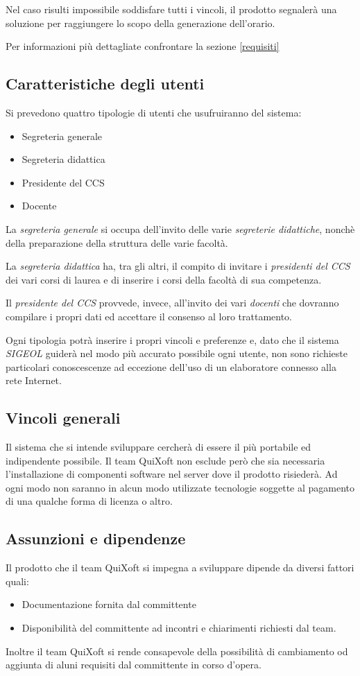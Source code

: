 \documentclass[11pt,a4paper]{article}
\begin{document}
Nel caso risulti impossibile soddisfare tutti i vincoli, il prodotto segnalerà una soluzione per raggiungere lo scopo della generazione dell'orario.

Per informazioni più dettagliate confrontare la sezione \ref{requisiti}
\subsection{Caratteristiche degli utenti} \label{utenti}
Si prevedono quattro tipologie di utenti che usufruiranno del sistema:
\begin{itemize}
 \item Segreteria generale
 \item Segreteria didattica
 \item Presidente del CCS
 \item Docente
\end{itemize}

La \textit{segreteria generale} si occupa dell'invito delle varie \textit{segreterie didattiche}, nonchè della preparazione della struttura delle varie facoltà.

La \textit{segreteria didattica} ha, tra gli altri, il compito di invitare i \textit{presidenti del CCS} dei vari corsi di laurea e di inserire i corsi della facoltà di sua competenza.

Il \textit{presidente del CCS} provvede, invece, all'invito dei vari \textit{docenti} che dovranno compilare i propri dati ed accettare il consenso al loro trattamento.

Ogni tipologia potrà inserire i propri vincoli e preferenze e, dato che il sistema \textit{SIGEOL} guiderà nel modo più accurato possibile ogni utente, non sono richieste particolari conoscescenze ad eccezione dell'uso di un elaboratore connesso alla rete Internet.
\subsection{Vincoli generali}
Il sistema che si intende sviluppare cercherà di essere il più portabile ed indipendente possibile. Il team QuiXoft non esclude però che sia necessaria l'installazione di componenti software nel server dove il prodotto risiederà. Ad ogni modo non saranno in alcun modo utilizzate tecnologie soggette al pagamento di una qualche forma di licenza o altro.
\subsection{Assunzioni e dipendenze}
Il prodotto che il team QuiXoft si impegna a sviluppare dipende da diversi fattori quali:
\begin{itemize}
 \item Documentazione fornita dal committente
 \item Disponibilità del committente ad incontri e chiarimenti richiesti dal team.
\end{itemize}
Inoltre il team QuiXoft si rende consapevole della possibilità di cambiamento od aggiunta di aluni requisiti dal committente in corso d'opera.
\end{document}
